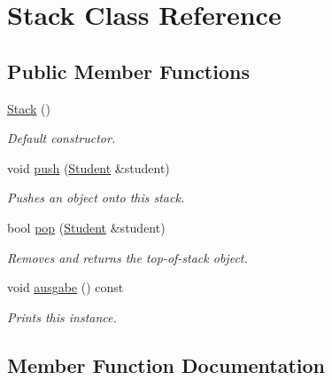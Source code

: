 \hypertarget{class_stack}{}\section{Stack Class Reference}
\label{class_stack}
\subsection*{Public Member Functions}
\begin{DoxyCompactItemize}
\item 
\mbox{\label{class_stack_a14cd1cba325bead4ff0a91bc6eb0f6f5}} 
\hyperlink{class_stack_a14cd1cba325bead4ff0a91bc6eb0f6f5}{Stack} ()
\begin{DoxyCompactList}\small\item\em Default constructor. \end{DoxyCompactList}\item 
void \hyperlink{class_stack_a049c37e69420f3a13c9c5835ba88a0bc}{push} (\hyperlink{class_student}{Student} \&student)
\begin{DoxyCompactList}\small\item\em Pushes an object onto this stack. \end{DoxyCompactList}\item 
bool \hyperlink{class_stack_aa938da04c682fc1b017a915e90dd4471}{pop} (\hyperlink{class_student}{Student} \&student)
\begin{DoxyCompactList}\small\item\em Removes and returns the top-\/of-\/stack object. \end{DoxyCompactList}\item 
\mbox{\label{class_stack_a15f5b63e791731edc265d74ec43c95f1}} 
void \hyperlink{class_stack_a15f5b63e791731edc265d74ec43c95f1}{ausgabe} () const
\begin{DoxyCompactList}\small\item\em Prints this instance. \end{DoxyCompactList}\end{DoxyCompactItemize}


\subsection{Member Function Documentation}
\mbox{\label{class_stack_aa938da04c682fc1b017a915e90dd4471}} 

